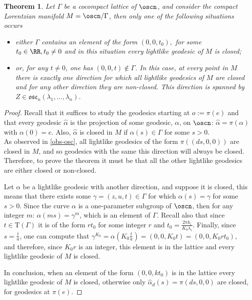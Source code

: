 \documentclass[11pt]{amsart}
\theoremstyle{plain}
\newtheorem{thm}{Theorem}[section]
\theoremstyle{definition}
\theoremstyle{remark}
\begin{document}
		\begin{thm}\label{teoremaoscilador}
			Let $\Gamma$ be a cocompact lattice of $\oscn$, and consider the compact Lorentzian manifold $M=\oscn/\Gamma$, then only one of the following situations occurs
			\begin{itemize}
				\item either $\Gamma$ contains an element of the form $(0,0,t_0),$ for some $t_0\in \RR, t_0 \neq 0$ and in this situation every lightlike geodesic of $M$ is closed;
				\item or, for any $t \neq 0$, one has $(0,0,t) \notin \Gamma$. In this case,   at every point in $M$ there is exactly one direction for which all lightlike geodesics of $M$ are closed and for any other direction they are non-closed. This direction is spanned by $Z \in \mathfrak{osc}_n(\lambda_1, ..., \lambda_n)$.		
			\end{itemize}
			
		\end{thm}
		
		\begin{proof}
			Recall that it suffices to study the geodesics starting at $o:=\pi(e)$ and that every geodesic $\hat{\alpha}$ is the projection of some geodesic, $\alpha$, on $\oscn$: $\hat{\alpha}=\pi(\alpha)$ with $\alpha(0)=e$. Also, $\hat{\alpha}$ is closed in $M$ if $\alpha(s) \in \Gamma$ for some $s>0$.\\
			
			As observed in \ref{obs-osc}, all lightlike geodesics of the form $\pi((ds,0,0))$ are closed in $M$, and so geodesics with the same this direction will always be closed. Therefore, to prove the theorem it must be that all the other lightlike geodesics are either closed or non-closed.
			
			Let $\alpha$ be a lightlike geodesic with another direction, and suppose it is closed, this means that there exists some $\gamma=(z,u,t) \in \Gamma$ for which $\alpha(s)=\gamma$ for some $s>0$. Since the curve $\alpha$ is a one-parameter subgroup of $\oscn$, then for any integer $m$: $\alpha(m s)=\gamma^m$, which is an element of $\Gamma$. Recall also that since $t \in \mathrm{T}(\Gamma)$ it is of the form $r t_0$ for some integer $r$ and $t_0=\frac{2 \pi k_i}{K_0 \lambda_i}$. Finally, since $s=\frac{t}{a}$, one can compute that $\gamma^{K_0} = \alpha(K_0 \frac{t}{a}) = (0,0,K_0 t) = (0,0,K_0 r t_0)$, and therefore, since $K_0 r$ is an integer, this element is in the lattice and every lightlike geodesic of $M$ is closed.
			
			In conclusion, when an element of the form $(0,0,k t_0)$ is in the lattice every lightlike geodesic of $M$ is closed, otherwise only $\hat{\alpha}_d(s)=\pi(ds,0,0)$ are closed, for geodesics at $\pi(e)$.			
		\end{proof}
		
\end{document}
